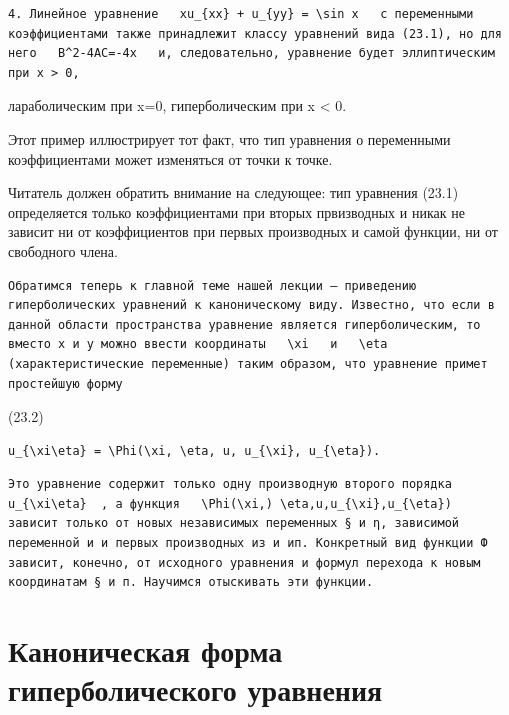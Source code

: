 \documentclass[
  ukrainian,
]{article}
\begin{document}
\begin{verbatim}
4. Линейное уравнение   xu_{xx} + u_{yy} = \sin x   с переменными коэффициентами также принадлежит классу уравнений вида (23.1), но для него   B^2-4AC=-4x   и, следовательно, уравнение будет эллиптическим при x > 0,
\end{verbatim}

лараболическим при x=0, гиперболическим при x \textless{} 0.

Этот пример иллюстрирует тот факт, что тип уравнения о переменными
коэффициентами может изменяться от точки к точке.

Читатель должен обратить внимание на следующее: тип уравнения (23.1)
определяется только коэффициентами при вторых првизводных и никак не
зависит ни от коэффициентов при первых производных и самой функции, ни
от свободного члена.

\begin{verbatim}
Обратимся теперь к главной теме нашей лекции — приведению гиперболических уравнений к каноническому виду. Известно, что если в данной области пространства уравнение является гиперболическим, то вместо x и y можно ввести координаты   \xi   и   \eta  (характеристические переменные) таким образом, что уравнение примет простейшую форму
\end{verbatim}

(23.2)

\begin{verbatim}
u_{\xi\eta} = \Phi(\xi, \eta, u, u_{\xi}, u_{\eta}).
\end{verbatim}

\begin{verbatim}
Это уравнение содержит только одну производную второго порядка   u_{\xi\eta}  , а функция   \Phi(\xi,) \eta,u,u_{\xi},u_{\eta})   зависит только от новых независимых переменных § и η, зависимой переменной и и первых производных из и ип. Конкретный вид функции Ф зависит, конечно, от исходного уравнения и формул перехода к новым координатам § и п. Научимся отыскивать эти функции.
\end{verbatim}

\section{Каноническая форма гиперболического
уравнения}\label{ux43aux430ux43dux43eux43dux438ux447ux435ux441ux43aux430ux44f-ux444ux43eux440ux43cux430-ux433ux438ux43fux435ux440ux431ux43eux43bux438ux447ux435ux441ux43aux43eux433ux43e-ux443ux440ux430ux432ux43dux435ux43dux438ux44f}
\end{document}
